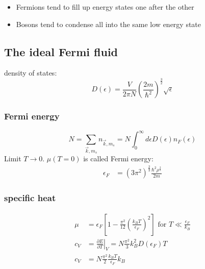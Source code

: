 \begin{itemize}
    \item Fermions tend to fill up energy states one after the other
    \item Bosons tend to condense all into the same low energy state
\end{itemize}

\subsection*{The ideal Fermi fluid}
density of states:
\begin{equation*}
    D(\epsilon) = \frac{V}{2\pi N} \left(\frac{2m}{\hbar^2}\right)^{\frac{3}{2}} \sqrt{\epsilon}
\end{equation*}

\subsubsection*{Fermi energy}
\begin{equation*}
    N = \sum_{\vec{k},m_s} n_{\vec{k},m_s} = N \int_0^\infty d\epsilon D(\epsilon) n_F(\epsilon)
\end{equation*}
Limit $T \rightarrow 0$. $\mu(T=0)$ is called Fermi energy:
\begin{equation*}
    \begin{aligned}
        \epsilon_F &= (3\pi^2)^{\frac{2}{3}} \frac{\hbar^2 \rho^{\frac{2}{3}}}{2m}
    \end{aligned}
\end{equation*}

\subsubsection*{specific heat}
\begin{equation*}
    \begin{aligned}
        \mu &= \epsilon_F \left[1-\frac{\pi^2}{12} \left(\frac{k_B T}{\epsilon_F}\right)^2\right] \text{ for } T \ll \frac{\epsilon_F}{k_B} \\
        c_V &= \left. \frac{\partial E}{\partial T} \right|_V = N \frac{\pi^2}{3} k_B^2 D(\epsilon_F)T \\
        c_V &= N \frac{\pi^2}{2} \frac{k_B T}{\epsilon_F} k_B
    \end{aligned}
\end{equation*}


